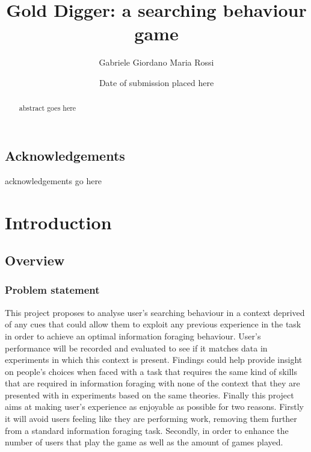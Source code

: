 \documentclass{mproj}
\begin{document}
\title{Gold Digger: a searching behaviour game}
\author{Gabriele Giordano Maria Rossi}
\date{Date of submission placed here}
\maketitle

\begin{abstract}
abstract goes here
\end{abstract}

\educationalconsent


\newpage
\section*{Acknowledgements}

acknowledgements go here

\tableofcontents
\listoffigures

\chapter{Introduction}\label{intro}

\section{Overview}
\subsection{Problem statement}
This project proposes to analyse user's searching behaviour in a context deprived of any cues 
that could allow them to exploit any previous experience in the task in order to achieve an 
optimal information foraging behaviour. 
User's performance will be recorded and evaluated to see if it matches data in experiments in 
which this context is present. Findings could help provide insight on people's choices when 
faced with a task that requires the same kind of skills that are required in information foraging 
with none of the context that they are presented with in experiments based on the same 
theories.
Finally this project aims at making user's experience as enjoyable as possible for two reasons.
Firstly it will avoid users feeling like they are performing work, removing them further from a 
standard information foraging task. Secondly, in order to enhance the number of users that 
play the game as well as the amount of games played.
\end{document}
